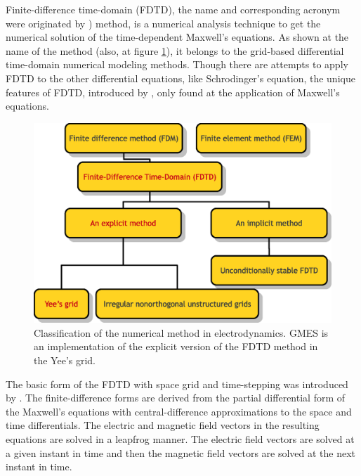 Finite-difference time-domain (FDTD), the name and corresponding acronym were originated by \citet{taflove_application_1980}) method, is a numerical analysis technique to get the numerical solution of the time-dependent Maxwell's equations. As shown at the name of the method (also, at figure \ref{fig:class_nm}), it belongs to the grid-based differential time-domain numerical modeling methods. Though there are attempts to apply FDTD to the other differential equations, like Schrodinger's equation, the unique features of FDTD, introduced by \citet{yee_numerical_1966}, only found at the application of Maxwell's equations.

\begin{figure}[hp!]
  \centering
  \includegraphics[width=\textwidth]{figure/class_nm}
  \caption{Classification of the numerical method in electrodynamics. GMES is an implementation of the explicit version of the FDTD method in the Yee's grid.}
  \label{fig:class_nm}
\end{figure}

The basic form of the FDTD with space grid and time-stepping was introduced by \citet{yee_numerical_1966}. The finite-difference forms are derived from the partial differential form of the Maxwell's equations with central-difference approximations to the space and time differentials. The electric and magnetic field vectors in the resulting equations are solved in a leapfrog manner. The electric field vectors are solved at a given instant in time and then the magnetic field vectors are solved at the next instant in time.

